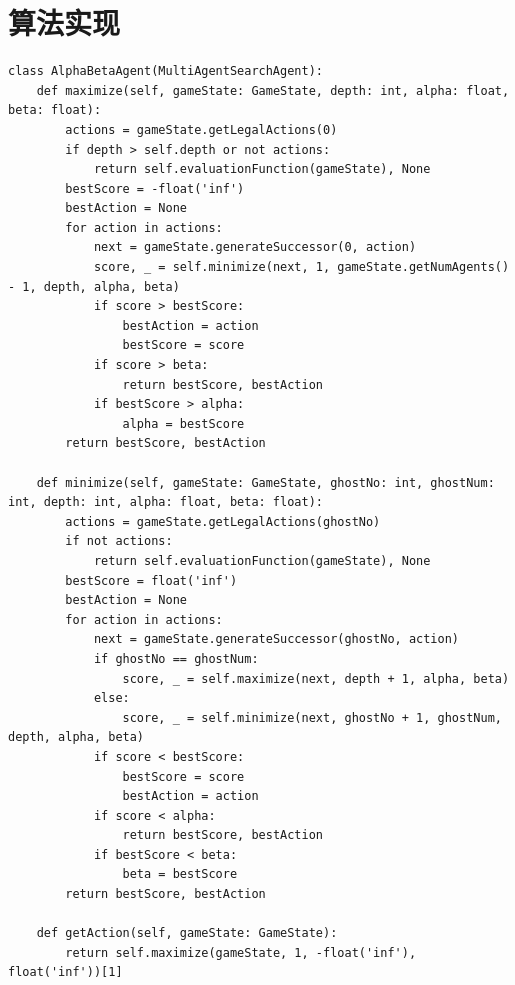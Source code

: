 \section{算法实现}
\begin{lstlisting}[emph={[3]currentGameState,gameState,depth,alpha,beta,ghostNo,ghostNum},emphstyle={[3]\color{vscode_parametercolor}},emph={[4]GameState,MinimaxAgent,AlphaBetaAgent},emphstyle={[4]\color{vscode_classcolor}}]
class AlphaBetaAgent(MultiAgentSearchAgent):
    def maximize(self, gameState: GameState, depth: int, alpha: float, beta: float):
        actions = gameState.getLegalActions(0)
        if depth > self.depth or not actions:
            return self.evaluationFunction(gameState), None
        bestScore = -float('inf')
        bestAction = None
        for action in actions:
            next = gameState.generateSuccessor(0, action)
            score, _ = self.minimize(next, 1, gameState.getNumAgents() - 1, depth, alpha, beta)
            if score > bestScore:
                bestAction = action
                bestScore = score
            if score > beta:
                return bestScore, bestAction
            if bestScore > alpha:
                alpha = bestScore
        return bestScore, bestAction

    def minimize(self, gameState: GameState, ghostNo: int, ghostNum: int, depth: int, alpha: float, beta: float):
        actions = gameState.getLegalActions(ghostNo)
        if not actions:
            return self.evaluationFunction(gameState), None
        bestScore = float('inf')
        bestAction = None
        for action in actions:
            next = gameState.generateSuccessor(ghostNo, action)
            if ghostNo == ghostNum:
                score, _ = self.maximize(next, depth + 1, alpha, beta)
            else:
                score, _ = self.minimize(next, ghostNo + 1, ghostNum, depth, alpha, beta)
            if score < bestScore:
                bestScore = score
                bestAction = action
            if score < alpha:
                return bestScore, bestAction
            if bestScore < beta:
                beta = bestScore
        return bestScore, bestAction

    def getAction(self, gameState: GameState):
        return self.maximize(gameState, 1, -float('inf'), float('inf'))[1]
\end{lstlisting}
